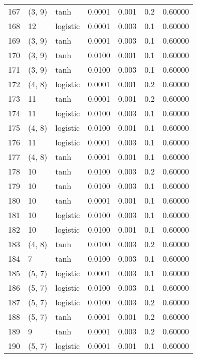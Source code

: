 \begin{tabular}{lllrrrr}
167 &      (3, 9) &      tanh &  0.0001 &  0.001 &  0.2 &   0.60000 \\
168 &          12 &  logistic &  0.0001 &  0.003 &  0.1 &   0.60000 \\
169 &      (3, 9) &      tanh &  0.0001 &  0.003 &  0.1 &   0.60000 \\
170 &      (3, 9) &      tanh &  0.0100 &  0.001 &  0.1 &   0.60000 \\
171 &      (3, 9) &      tanh &  0.0100 &  0.003 &  0.1 &   0.60000 \\
172 &      (4, 8) &  logistic &  0.0001 &  0.001 &  0.2 &   0.60000 \\
173 &          11 &      tanh &  0.0001 &  0.001 &  0.2 &   0.60000 \\
174 &          11 &  logistic &  0.0100 &  0.003 &  0.1 &   0.60000 \\
175 &      (4, 8) &  logistic &  0.0100 &  0.001 &  0.1 &   0.60000 \\
176 &          11 &  logistic &  0.0001 &  0.003 &  0.1 &   0.60000 \\
177 &      (4, 8) &      tanh &  0.0001 &  0.001 &  0.1 &   0.60000 \\
178 &          10 &      tanh &  0.0100 &  0.003 &  0.2 &   0.60000 \\
179 &          10 &      tanh &  0.0100 &  0.003 &  0.1 &   0.60000 \\
180 &          10 &      tanh &  0.0001 &  0.001 &  0.1 &   0.60000 \\
181 &          10 &  logistic &  0.0100 &  0.003 &  0.1 &   0.60000 \\
182 &          10 &  logistic &  0.0100 &  0.001 &  0.1 &   0.60000 \\
183 &      (4, 8) &      tanh &  0.0100 &  0.003 &  0.2 &   0.60000 \\
184 &           7 &      tanh &  0.0100 &  0.003 &  0.1 &   0.60000 \\
185 &      (5, 7) &  logistic &  0.0001 &  0.003 &  0.1 &   0.60000 \\
186 &      (5, 7) &  logistic &  0.0100 &  0.003 &  0.1 &   0.60000 \\
187 &      (5, 7) &  logistic &  0.0100 &  0.003 &  0.2 &   0.60000 \\
188 &      (5, 7) &      tanh &  0.0001 &  0.001 &  0.2 &   0.60000 \\
189 &           9 &      tanh &  0.0001 &  0.003 &  0.2 &   0.60000 \\
190 &      (5, 7) &  logistic &  0.0001 &  0.001 &  0.1 &   0.60000 \\

\end{tabular}

